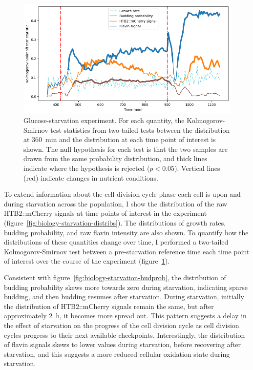 \begin{figure}
  \centering
  \includegraphics[width=\textwidth]{19972_ks_highlight}
  \caption{
    Glucose-starvation experiment.
    For each quantity, the Kolmogorov-Smirnov test statistics from two-tailed tests between the distribution at \SI{360}{\minute} and the distribution at each time point of interest is shown.
    The null hypothesis for each test is that the two samples are drawn from the same probability distribution, and thick lines indicate where the hypothesis is rejected ($p < 0.05$).
    Vertical lines (red) indicate changes in nutrient conditions.
  }
  \label{fig:biology-starvation-ks}
\end{figure}

To extend information about the cell division cycle phase each cell is upon and during starvation across the population, I show the distribution of the raw HTB2::mCherry signals at time points of interest in the experiment (figure~\ref{fig:biology-starvation-distribs}).
The distributions of growth rates, budding probability, and raw flavin intensity are also shown.
To quantify how the distributions of these quantities change over time, I performed a two-tailed Kolmogorov-Smirnov test between a pre-starvation reference time each time point of interest over the course of the experiment (figure~\ref{fig:biology-starvation-ks}).

Consistent with figure~\ref{fig:biology-starvation-budprob}, the distribution of budding probability skews more towards zero during starvation, indicating sparse budding, and then budding resumes after starvation.
During starvation, initially the distribution of HTB2::mCherry signals remain the same, but after approximately \SI{2}{\hour}, it becomes more spread out.
This pattern suggests a delay in the effect of starvation on the progress of the cell division cycle as cell division cycles progress to their next available checkpoints.
Interestingly, the distribution of flavin signals skews to lower values during starvation, before recovering after starvation, and this suggests a more reduced cellular oxidation state during starvation.


